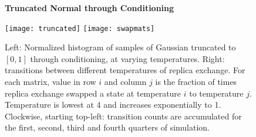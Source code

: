 \begin{figure}[!htb]
\centering
\textbf{Truncated Normal through Conditioning}\par\medskip
\texttt{[image: truncated]}
\texttt{[image: swapmats]}

	
	
	\caption{Left: Normalized histogram of samples of Gaussian truncated to $[0, 1]$ through conditioning, at varying temperatures. Right: transitions between different temperatures of replica exchange.  For each matrix, value in row $i$ and column $j$ is the fraction of times replica exchange swapped a state at temperature $i$ to temperature $j$.  Temperature is lowest at 4 and increases exponentially to 1.  Clockwise, starting top-left: transition counts are accumulated for the first, second, third and fourth quarters of simulation.}
	\label{fig:density}
	\vspace{-.5em}
\end{figure}



